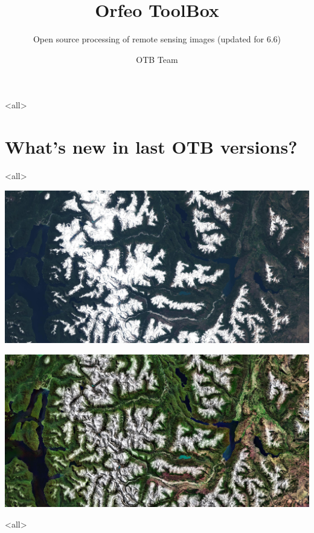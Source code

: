 \documentclass[8pt]{beamer}
\title{Orfeo ToolBox}
\subtitle{Open source processing of remote sensing images (updated for 6.6)}
\author{OTB Team}
\date{}
\begin{document}
\begin{frame}
\titlepage
\end{frame}

\mode<all>


\section{What's new in last OTB versions?}
\mode<all>


\vspace*{-6.5mm}
\begin{frame}[plain]
\hspace*{-11mm}
    \includegraphics[keepaspectratio,height=1.1\paperheight]{images/imag4tci.jpg}
\end{frame}

\vspace*{-6.5mm}
\begin{frame}[plain]
\hspace*{-11mm}
\includegraphics[keepaspectratio,height=1.1\paperheight]{images/image4_glob_each_lim20_8b_sub.jpg}
\end{frame}

\mode<all>

\end{document}
